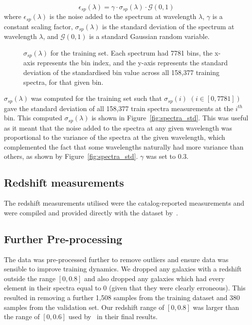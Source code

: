 \begin{equation}
\label{eq:spectrum-noise}
    \epsilon_{sp}(\lambda) = \gamma \cdot \sigma_{sp}(\lambda) \cdot \mathcal{G}(0, 1)
\end{equation}
where $\epsilon_{sp}(\lambda)$ is the noise added to the spectrum at wavelength $\lambda$, $\gamma$ is a constant scaling factor,
$\sigma_{sp}(\lambda)$ is the standard deviation of the spectrum at wavelength $\lambda$,
and $\mathcal{G}(0, 1)$ is a standard Gaussian random variable.
\begin{figure}[t]
    \centering
    \caption{$\sigma_{sp}(\lambda)$ for the training set.
    Each spectrum had 7781 bins, the x-axis represents the bin index, and the y-axis represents the standard deviation
    of the standardised bin value across all 158,377 training spectra, for that given bin.}
    \label{fig:spectra_std}
\end{figure}
$\sigma_{sp}(\lambda)$ was computed for the training set such that $\sigma_{sp}(i)$ $(i \in [0, 7781])$ gave the standard
deviation of all 158,377 train spectra measurements at the $i^{th}$ bin.
This computed $\sigma_{sp}(\lambda)$ is shown in Figure~\eqref{fig:spectra_std}.
This was useful as it meant that the noise added to the spectra at any given wavelength was proportional to the variance
of the spectra at the given wavelength, which complemented the fact that some wavelengths naturally had more variance than others,
as shown by Figure~\eqref{fig:spectra_std}.
$\gamma$ was set to 0.3.

\subsection{Redshift measurements}\label{subsec:redshift}
The redshift measurements utilised were the catalog-reported measurements and were compiled and provided directly with the
dataset by~\cite{astroclip}.

\subsection{Further Pre-processing}\label{subsec:pre-processing}
The data was pre-processed further to remove outliers and ensure data was sensible to improve training dynamics.
We dropped any galaxies with a redshift outside the range $[0, 0.8]$ and also dropped any galaxies which had every element
in their spectra equal to 0 (given that they were clearly erroneous).
This resulted in removing a further 1,508 samples from the training dataset and 380 samples from the
validation set.
Our redshift range of $[0, 0.8]$ was larger than the range of $[0, 0.6]$ used by~\cite{astroclip} in their final results.
